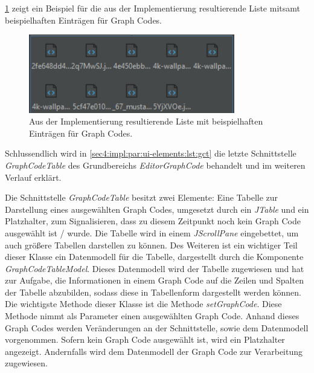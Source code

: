 \cref{sec4:impl:par:ui-elements:fig:wireframe-ui-5} zeigt ein Beispiel für die aus der Implementierung resultierende Liste mitsamt beispielhaften Einträgen für Graph Codes.

\begin{figure}[!ht]
  \includegraphics[width=9cm]{chapter/chapter_4/wireframe-impl-ui-5}
  \caption{Aus der Implementierung resultierende Liste mit beispielhaften Einträgen für Graph Codes.}
  \label{sec4:impl:par:ui-elements:fig:wireframe-ui-5}
\end{figure}

Schlussendlich wird in \cref{sec4:impl:par:ui-elements:lst:gct} die letzte Schnittstelle  \textit{GraphCodeTable} des Grundbereichs \textit{EditorGraphCode} behandelt und im weiteren Verlauf erklärt.



Die Schnittstelle \textit{GraphCodeTable} besitzt zwei Elemente: Eine Tabelle zur Darstellung eines ausgewählten Graph Codes, umgesetzt durch ein \textit{JTable} und ein Platzhalter, zum Signalisieren, dass zu diesem Zeitpunkt noch kein Graph Code ausgewählt ist / wurde.
Die Tabelle wird in einem \textit{JScrollPane} eingebettet, um auch größere Tabellen darstellen zu können.
Des Weiteren ist ein wichtiger Teil dieser Klasse ein Datenmodell für die Tabelle, dargestellt durch die Komponente \textit{GraphCodeTableModel}.
Dieses Datenmodell wird der Tabelle zugewiesen und hat zur Aufgabe, die Informationen in einem Graph Code auf die Zeilen und Spalten der Tabelle abzubilden, sodass diese in Tabellenform dargestellt werden können.
Die wichtigste Methode dieser Klasse ist die Methode \textit{setGraphCode}.
Diese Methode nimmt als Parameter einen ausgewählten Graph Code.
Anhand dieses Graph Codes werden Veränderungen an der Schnittstelle, sowie dem Datenmodell vorgenommen.
Sofern kein Graph Code ausgewählt ist, wird ein Platzhalter angezeigt.
Andernfalls wird dem Datenmodell der Graph Code zur Verarbeitung zugewiesen.


